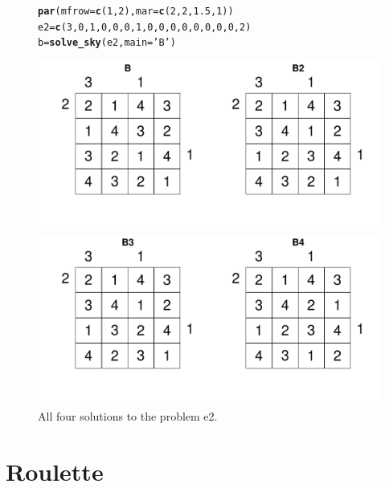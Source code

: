 \documentclass[12pt]{article}\usepackage[]{graphicx}\usepackage[]{color}
\makeatletter
\newcommand{\hlnum}[1]{\textcolor[rgb]{0.686,0.059,0.569}{#1}}%
\newcommand{\hlstr}[1]{\textcolor[rgb]{0.192,0.494,0.8}{#1}}%
\newcommand{\hlstd}[1]{\textcolor[rgb]{0.345,0.345,0.345}{#1}}%
\newcommand{\hlkwb}[1]{\textcolor[rgb]{0.69,0.353,0.396}{#1}}%
\newcommand{\hlkwc}[1]{\textcolor[rgb]{0.333,0.667,0.333}{#1}}%
\newcommand{\hlkwd}[1]{\textcolor[rgb]{0.737,0.353,0.396}{\textbf{#1}}}%
\newenvironment{kframe}{%
 \def\at@end@of@kframe{}%
 \ifinner\ifhmode%
  \def\at@end@of@kframe{\end{minipage}}%
  \begin{minipage}{\columnwidth}%
 \fi\fi%
 \def\FrameCommand##1{\hskip\@totalleftmargin \hskip-\fboxsep
 \colorbox{shadecolor}{##1}\hskip-\fboxsep
     \hskip-\linewidth \hskip-\@totalleftmargin \hskip\columnwidth}%
 \MakeFramed {\advance\hsize-\width
   \@totalleftmargin\z@ \linewidth\hsize
   \@setminipage}}%
 {\par\unskip\endMakeFramed%
 \at@end@of@kframe}
\newenvironment{knitrout}{}{} %
\makeatother
\begin{document}
\begin{figure}[h!]
  \centering
\begin{knitrout}
\color{fgcolor}\begin{kframe}
\begin{alltt}
\hlkwd{par}\hlstd{(}\hlkwc{mfrow}\hlstd{=}\hlkwd{c}\hlstd{(}\hlnum{1}\hlstd{,}\hlnum{2}\hlstd{),}\hlkwc{mar}\hlstd{=}\hlkwd{c}\hlstd{(}\hlnum{2}\hlstd{,}\hlnum{2}\hlstd{,}\hlnum{1.5}\hlstd{,}\hlnum{1}\hlstd{))}
\hlstd{e2} \hlkwb{=} \hlkwd{c}\hlstd{(}\hlnum{3}\hlstd{,}\hlnum{0}\hlstd{,}\hlnum{1}\hlstd{,}\hlnum{0}\hlstd{,} \hlnum{0}\hlstd{,}\hlnum{0}\hlstd{,}\hlnum{1}\hlstd{,}\hlnum{0}\hlstd{,} \hlnum{0}\hlstd{,}\hlnum{0}\hlstd{,}\hlnum{0}\hlstd{,}\hlnum{0}\hlstd{,} \hlnum{0}\hlstd{,}\hlnum{0}\hlstd{,}\hlnum{0}\hlstd{,}\hlnum{2}\hlstd{)}
\hlstd{b} \hlkwb{=} \hlkwd{solve_sky}\hlstd{(e2,} \hlkwc{main} \hlstd{=} \hlstr{'B'}\hlstd{)}
\end{alltt}
\end{kframe}
\includegraphics[width=.7\linewidth]{figure/unnamed-chunk-7-1} 

\includegraphics[width=.7\linewidth]{figure/unnamed-chunk-7-2} 

\end{knitrout}
\caption{All four solutions to the problem e2.}
\label{fig:plot3}
\end{figure}

\newpage

\section{Roulette}
\end{document}
